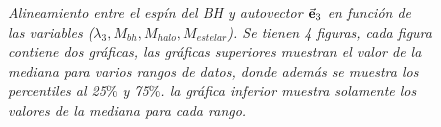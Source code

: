 \begin{figure}
\caption{\emph{Alineamiento entre el espín del BH y autovector $\vec{\bf{e}}_3$ en función de las variables ($\lambda_{3}, M_{bh}, M_{halo}, M_{estelar}$). Se tienen 4 figuras, cada figura contiene dos gráficas, las gráficas superiores muestran el valor de la mediana para varios rangos de datos, donde además se muestra los percentiles al 25$\%$ y 75$\%$. la gráfica inferior muestra solamente los valores de la mediana para cada rango.} }
\label{fig: median dispercion} 
\end{figure}







